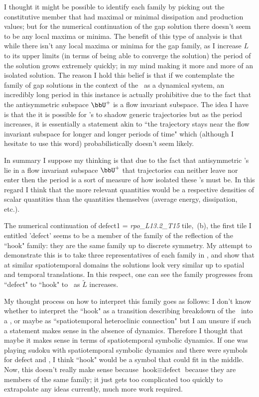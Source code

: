 

I thought it might be possible to identify each family by picking out the
constitutive member that had maximal or minimal dissipation and
production values; but for the numerical continuation of the gap solution
there doesn't seem to be any local maxima or minima. The benefit of this
type of analysis is that while there isn't any local maxima or minima for
the gap family, as I increase $L$ to its upper limits (in terms of being
able to converge the solution) the period of the solution grows extremely
quickly; in my mind making it more and more of an isolated solution. The
reason I hold this belief is that if we contemplate the family of gap
solutions in the context of the \KSe\ as a dynamical system, an
incredibly long period in this instance is actually prohibitive due to
the fact that the antisymmetric subspace $\bbU^+$ is a flow invariant
subspace. The idea I have is that the it is possible for \po 's to shadow
generic trajectories but as the period increases, it is essentially a
statement akin to ``the trajectory stays near the flow invariant subspace
for longer and longer periods of time" which (although I hesitate to use
this word) probabilistically doesn't seem likely.

In summary I suppose my thinking is that due to the fact that
antisymmetric \po 's lie in a flow invariant subspace $\bbU^+$ that
trajectories can neither leave nor enter then the period is a sort of
measure of how isolated these \po 's must be. In this regard I think that
the more relevant quantities would be a respective densities of scalar
quantities than the quantities themselves (average energy, dissipation,
etc.).

The numerical continuation of defect1 = \emph{rpo\_L13.2\_T15}  tile,
\,(b), the first tile I entitled 'defect'
seems to be a member of the family of the reflection of the ``hook"
family: they are the same family up to discrete symmetry. My attempt
to demonstrate this is to take three representatives of each family in
, and show that at similar
spatiotemporal domains the solutions look very similar up to spatial and
temporal translations.
In this respect, one can see the family progresses from ``defect"
 to ``hook" to \reqv\, as $\tilde{L}$ increases.

My thought process on how to interpret this family goes as follows:
I don't know whether to interpret the ``hook" as a transition describing
breakdown of the \twot\ into a \reqv, or maybe as ``spatiotemporal
heteroclinic connection" but I am unsure if such a statement makes sense
in the absence of dynamics. Therefore I thought that maybe it makes sense
in terms of spatiotemporal symbolic dynamics. If one was playing sudoku
with spatiotemporal symbolic dynamics and there were symbols for defect
and \reqv, I think ``hook" would be a symbol that could fit in the
middle. Now, this doesn't really make sense because $\text{hook}\equiv
\text{defect}$ because they are members of the same family; it just gets
too complicated too quickly to extrapolate any ideas currently, much more
work required.

